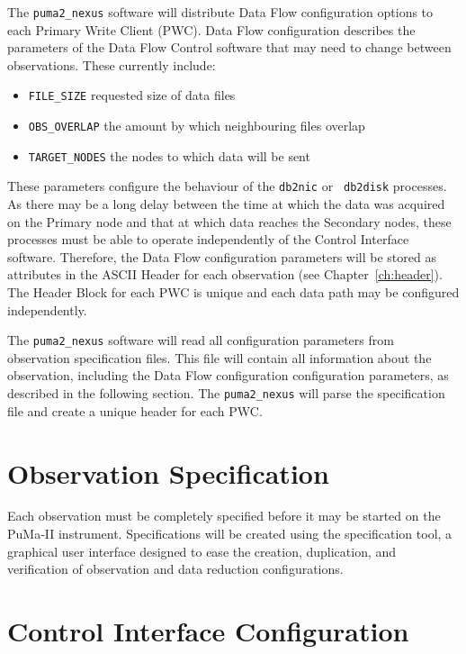 The {\tt puma2\_nexus} software will distribute Data Flow configuration
options to each Primary Write Client (PWC).  Data Flow configuration
describes the parameters of the Data Flow Control software that may
need to change between observations.  These currently
include:
\begin{itemize}
\item{\tt FILE\_SIZE} requested size of data files
\item{\tt OBS\_OVERLAP} the amount by which neighbouring files overlap
\item{\tt TARGET\_NODES} the nodes to which data will be sent
\end{itemize}
These parameters configure the behaviour of the {\tt db2nic} or {\tt
db2disk} processes.  As there may be a long delay between the time at
which the data was acquired on the Primary node and that at which data
reaches the Secondary nodes, these processes must be able to operate
independently of the Control Interface software.  Therefore, the
Data Flow configuration parameters will be stored as attributes in the
ASCII Header for each observation (see Chapter~\ref{ch:header}).  The
Header Block for each PWC is unique and each data
path may be configured independently.

The {\tt puma2\_nexus} software will read all configuration parameters
from observation specification files.  This file will contain all
information about the observation, including the Data Flow
configuration configuration parameters, as described in the following
section.  The {\tt puma2\_nexus} will parse the specification file and
create a unique header for each PWC.

\section{Observation Specification}

Each observation must be completely specified before it may be started
on the PuMa-II instrument.  Specifications will be created using the
specification tool, a graphical user interface designed to ease the
creation, duplication, and verification of observation and data
reduction configurations.

\section{Control Interface Configuration}

